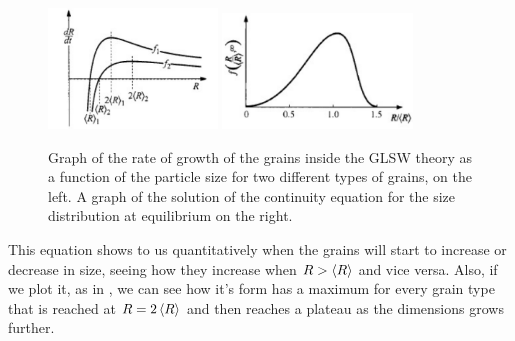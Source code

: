 \begin{figure}[t]
    \centering
    \includegraphics[width=0.4\textwidth]{Immagini/RateGrowth.png}
    \includegraphics[width=0.45\textwidth]{Immagini/RDistr.png}
    \caption
    {
        Graph of the rate of growth of the grains inside the GLSW theory as a function of the particle size for two different types of grains, on the left. A graph of the solution of the continuity equation for the size distribution at equilibrium on the right.
    }
    \label{fig:rateRdist}
\end{figure}

\noindent
This equation shows to us quantitatively when the grains will start to increase or decrease in size, seeing how they increase when $R > \left\langle R \right\rangle$ and vice versa. Also, if we plot it, as in , we can see how it's form has a maximum for every grain type that is reached at $R = 2\left\langle R \right\rangle$ and then reaches a plateau as the dimensions grows further.

